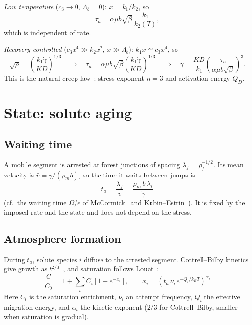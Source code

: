 \documentclass[11pt]{article}
\newcommand{\gd}{\dot\gamma}
\newcommand{\kT}{k_BT}
\numberwithin{equation}{section}
\begin{document}
\emph{Low temperature} ($c_3\to0$, $\Lambda_b=0$): $x=k_1/k_2$, so
\begin{equation}
\tau_a=\alpha\mu b\sqrt{\beta}\,\frac{k_1}{k_2(T)},
\end{equation}
which is independent of rate.

\emph{Recovery controlled} ($c_3x^4\gg k_2x^2$, $x\gg\Lambda_b$): $k_1x\simeq c_3x^4$, so
\begin{equation}
\sqrt\rho=\left(\frac{k_1\gd}{K D}\right)^{1/3}\quad\Longrightarrow\quad
\tau_a=\alpha\mu b\sqrt\beta\left(\frac{k_1\gd}{K D}\right)^{1/3}\quad\Longrightarrow\quad
\gd=\frac{K D}{k_1}\left(\frac{\tau_a}{\alpha\mu b\sqrt\beta}\right)^3 .
\label{eq:natural}
\end{equation}
This is the natural creep law~\cite{Poirier1985,Blum2002}: stress exponent $n=3$ and activation energy $Q_D$.

\section{State: solute aging}
\label{sec:aging}
\subsection{Waiting time}
A mobile segment is arrested at forest junctions of spacing $\lambda_f=\rho_f^{-1/2}$. Its mean velocity is $\bar v=\gd/(\rho_m b)$, so the time it waits between jumps is
\begin{equation}
t_a=\frac{\lambda_f}{\bar v}=\frac{\rho_m\,b\,\lambda_f}{\gd}
\label{eq:ta}
\end{equation}
(cf.\ the waiting time $\Omega/\dot\epsilon$ of McCormick~\cite{McCormick1988} and Kubin--Estrin~\cite{KubinEstrin1990}). It is fixed by the imposed rate and the state and does not depend on the stress.

\subsection{Atmosphere formation}
During $t_a$, solute species $i$ diffuse to the arrested segment. Cottrell--Bilby kinetics give growth as $t^{2/3}$~\cite{CottrellBilby}, and saturation follows Louat~\cite{Louat1981}:
\begin{equation}
\boxed{\;\frac{C}{C_0}=1+\sum_iC_i\left[1-e^{-x_i}\right],\qquad x_i=\left(t_a\,\nu_i\,e^{-Q_i/\kT}\right)^{\alpha_i}\;}
\label{eq:aging}
\end{equation}
Here $C_i$ is the saturation enrichment, $\nu_i$ an attempt frequency, $Q_i$ the effective migration energy, and $\alpha_i$ the kinetic exponent ($2/3$ for Cottrell--Bilby, smaller when saturation is gradual).
\end{document}
